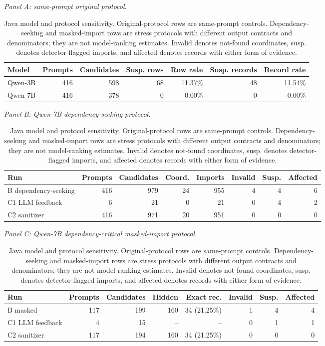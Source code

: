 \documentclass[pdflatex,sn-basic]{sn-jnl}
\begin{document}
\begin{table}[htbp]
\caption{Java model and protocol sensitivity. Original-protocol rows are same-prompt controls. Dependency-seeking and masked-import rows are stress protocols with different output contracts and denominators; they are not model-ranking estimates. Invalid denotes not-found coordinates, susp. denotes detector-flagged imports, and affected denotes records with either form of evidence.}
\label{tab:java-protocols}
{\footnotesize
\setlength{\tabcolsep}{2.5pt}
\textit{Panel A: same-prompt original protocol.}\par\smallskip
\begin{tabular}{@{}lrrrrrr@{}}
\toprule
Model & Prompts & Candidates & Susp. rows & Row rate & Susp. records & Record rate \\
\midrule
Qwen-3B & 416 & 598 & 68 & 11.37\% & 48 & 11.54\% \\
Qwen-7B & 416 & 378 & 0 & 0.00\% & 0 & 0.00\% \\
\bottomrule
\end{tabular}
\medskip

\textit{Panel B: Qwen-7B dependency-seeking protocol.}\par\smallskip
\begin{tabular}{@{}lrrrrrrr@{}}
\toprule
Run & Prompts & Candidates & Coord. & Imports & Invalid & Susp. & Affected \\
\midrule
B dependency-seeking & 416 & 979 & 24 & 955 & 4 & 4 & 6 \\
C1 LLM feedback & 6 & 21 & 0 & 21 & 0 & 4 & 2 \\
C2 sanitizer & 416 & 971 & 20 & 951 & 0 & 0 & 0 \\
\bottomrule
\end{tabular}
\medskip

\textit{Panel C: Qwen-7B dependency-critical masked-import protocol.}\par\smallskip
\begin{tabular}{@{}lrrrrrrr@{}}
\toprule
Run & Prompts & Candidates & Hidden & Exact rec. & Invalid & Susp. & Affected \\
\midrule
B masked & 117 & 199 & 160 & 34 (21.25\%) & 1 & 4 & 4 \\
C1 LLM feedback & 4 & 15 & -- & -- & 0 & 1 & 1 \\
C2 sanitizer & 117 & 194 & 160 & 34 (21.25\%) & 0 & 0 & 0 \\
\bottomrule
\end{tabular}
}
\end{table}
\end{document}
